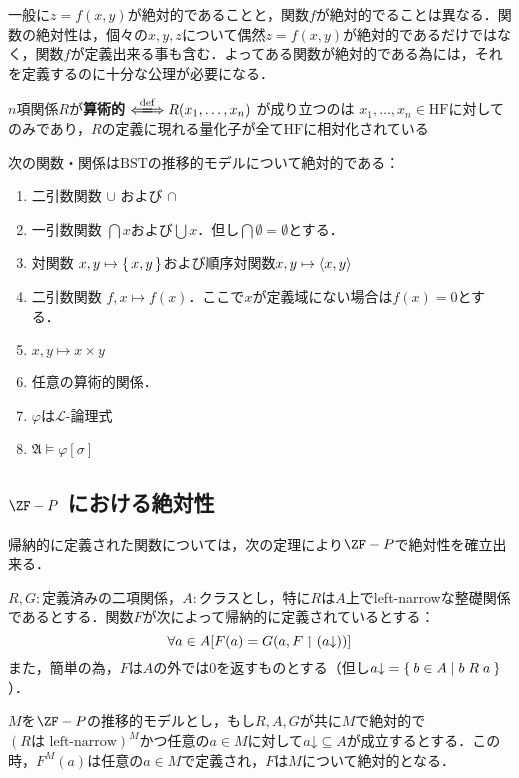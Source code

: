 \documentclass[xelatex,a4j,jadriver=standard]{bxjsarticle}
\newcommand{\BST}{\mathrm{BST}}
\newcommand{\HF}{\mathrm{HF}}
\begin{document}
一般に$z = f(x,y)$が絶対的であることと，関数$f$が絶対的でることは異なる．関数の絶対性は，個々の$x, y, z$について偶然$z = f(x,y)$が絶対的であるだけではなく，関数$f$が定義出来る事も含む．よってある関数が絶対的である為には，それを定義するのに十分な公理が必要になる．

\begin{definition}
 $n$項関係$R$が{\bfseries 算術的} $\defs R(x_1, \dots, x_n)$ が成り立つのは $x_1, \dots, x_n \in \HF$に対してのみであり，$R$の定義に現れる量化子が全て$\HF$に相対化されている
\end{definition}

\begin{theorem}[$\BST$で絶対的な関数・関係]
 次の関数・関係は$\BST$の推移的モデルについて絶対的である：

 \begin{enumerate}
  \item 二引数関数 $\cup$ および $\cap$
  \item 一引数関数 $\bigcap x$および$\bigcup x$．但し$\bigcap \emptyset = \emptyset$とする．
  \item 対関数 $x, y \mapsto \set{x,y}$および順序対関数$x, y \mapsto \braket{x, y}$
  \item 二引数関数 $f, x \mapsto f(x)$．ここで$x$が定義域にない場合は$f(x) = 0$とする．
  \item $x, y \mapsto x \times y$
  \item 任意の算術的関係．
  \item $\varphi$は$\mathcal{L}$-論理式
  \item $\mathfrak{A} \models \varphi[\sigma]$
 \end{enumerate}
\end{theorem}

\subsection{$\ZF-P$ における絶対性}

帰納的に定義された関数については，次の定理により$\ZF-P$で絶対性を確立出来る．

\begin{theorem}[帰納的に定義され関数の絶対性]
 $R, G:$定義済みの二項関係，$A:$クラスとし，特に$R$は$A$上でleft-narrowな整礎関係であるとする．関数$F$が次によって帰納的に定義されているとする：
 \[
  \forall a \in A [F(a) = G(a, F \upharpoonleft (a\mathord{\downarrow}))]
 \]
 また，簡単の為，$F$は$A$の外では$0$を返すものとする（但し$a \mathord{\downarrow} = \Set{b \in A | b \mathrel{R} a}$）．

 $M$を$\ZF-P$の推移的モデルとし，もし$R, A, G$が共に$M$で絶対的で$(R \text{は left-narrow})^M$かつ任意の$a \in M$に対して$a \mathord{\downarrow} \subseteq A$が成立するとする．この時，$F^M(a)$は任意の$a \in M$で定義され，$F$は$M$について絶対的となる．
\end{theorem}
\end{document}
